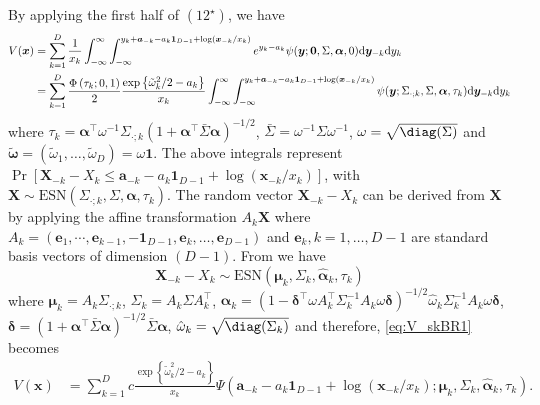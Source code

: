 \documentclass[12pt]{article}
\begin{document}
By applying the first half of $(12^\star)$, we have
\begin{align}
\label{eq:V_skBR1}
V(\bm x) &= 
\sum_{k=1}^D \frac{1}{x_k} \int_{-\infty}^\infty \int_{-\infty}^{y_k+\bm a_{-k}-a_k\bm 1_{D-1}+\log(\bm x_{-k}/x_k)} e^{y_k-a_k} \psi(\bm y;\bm 0, \Sigma,\bm \alpha, 0) \text d \bm y_{-k} \text d y_k \nonumber \\
&= \sum_{k=1}^D \frac{\Phi\left(\tau_k; 0, 1\right)}{2} \frac{\exp \left\{\tilde{\omega}_k^2/2-a_k\right\}}{x_k} \int_{-\infty}^\infty\int_{-\infty}^{y_k+ \bm a_{-k}-a_k\bm 1_{D-1}+\log(\bm x_{-k}/x_k)}
\psi(\bm y;\Sigma_{\cdot;k}, \Sigma, \bm \alpha, \tau_k)\text d \bm y_{-k} \text d y_k
\end{align}
where $\tau_k=\bm \alpha^\top\omega^{-1}\Sigma_{\cdot;k} \left(1+\bm\alpha^\top\bar\Sigma \bm\alpha \right)^{-1/2}$, $\bar{\Sigma} = \omega^{-1} \Sigma \omega^{-1}$, $\omega = \sqrt{\diag(\Sigma)}$ and $\tilde{\bm \omega} = \left( \tilde{\omega}_1, \ldots, \tilde{ \omega}_D\right) = \omega \bm 1$. The above integrals represent $\Pr[\bm X_{-k}-X_k\leq \bm a_{-k}-a_{k}\bm 1_{D-1}+\log(\bm x_{-k}/x_k)]$, with $\bm X \sim \text{ESN}(\Sigma_{\cdot;k},\Sigma,\bm \alpha, \tau_k)$. The random vector $\bm X_{-k}-X_k$ can be derived from $\bm X$ by applying the affine transformation $A_k \bm X$ where $A_k = (\bm e_1,\cdots,\bm e_{k-1},-\bm 1_{D-1},\bm e_{k},\ldots,\bm e_{D-1})$ and $\bm e_k, k=1, \ldots, D-1$ are standard basis vectors of dimension $(D-1)$. From \citet[Chapter~5]{Azzalini:2013} we have 
%
$$
\bm X_{-k}-X_k \sim \text{ESN} \left( \bm \mu_k, \Sigma_k, \hat{\bm \alpha}_k, \tau_k\right)
$$
%
where $\bm \mu_k = A_k\Sigma_{\cdot;k}$, 
$\Sigma_k = A_k\Sigma A_k^\top$, 
$\hat{\bm \alpha}_k = (1-\bm\delta^\top \omega A_k^\top\Sigma_k^{-1}A_k\omega\bm\delta)^{-1/2} \hat \omega_k \Sigma_k^{-1}A_k\omega\bm\delta$, 
$\bm \delta = \left( 1 + \bm \alpha^\top \bar{\Sigma} \bm \alpha\right)^{-1/2}\bar{\Sigma} \bm \alpha$, 
$\hat{\omega}_k = \sqrt{\diag(\Sigma_k)}$
and therefore, \eqref{eq:V_skBR1} becomes
%
\begin{align}
\label{eq:V_skBR2}
V(\bm x) &= \sum_{k=1}^D c \frac{\exp\left\{\tilde{\omega}_k^2/2-a_k\right\}}{x_k}
\Psi \left( \bm a_{-k}-a_{k} \bm 1_{D-1}+\log(\bm x_{-k}/x_k) ; \bm \mu_k, \Sigma_k, \hat{\bm \alpha}_k, \tau_k\right).
\end{align}
\end{document}
